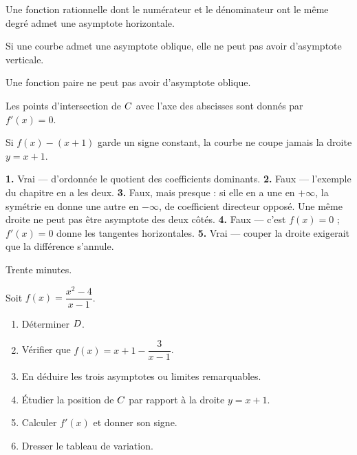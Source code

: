\begin{vraifaux}
\exo Une fonction rationnelle dont le numérateur et le dénominateur ont le
même degré admet une asymptote horizontale.

\exo Si une courbe admet une asymptote oblique, elle ne peut pas avoir
d'asymptote verticale.

\exo Une fonction paire ne peut pas avoir d'asymptote oblique.

\exo Les points d'intersection de $C$ avec l'axe des abscisses sont donnés
par $f'(x) = 0$.

\exo Si $f(x)-(x+1)$ garde un signe constant, la courbe ne coupe jamais la
droite $y = x+1$.
\end{vraifaux}

\begin{corrige}
\textbf{1.} Vrai — d'ordonnée le quotient des coefficients dominants.
\textbf{2.} Faux — l'exemple du chapitre en a les deux.
\textbf{3.} Faux, mais presque : si elle en a une en $+\infty$, la symétrie
en donne une autre en $-\infty$, de coefficient directeur opposé. Une même
droite ne peut pas être asymptote des deux côtés.
\textbf{4.} Faux — c'est $f(x) = 0$ ; $f'(x) = 0$ donne les tangentes
horizontales.
\textbf{5.} Vrai — couper la droite exigerait que la différence s'annule.
\end{corrige}

\begin{jemeteste}
Trente minutes.

Soit $f(x) = \dfrac{x^{2}-4}{x-1}$.

\begin{enumerate}[label=\textbf{\arabic*.}, leftmargin=*, itemsep=0.3em]
  \item Déterminer $D$.
  \item Vérifier que $f(x) = x+1-\dfrac{3}{x-1}$.
  \item En déduire les trois asymptotes ou limites remarquables.
  \item Étudier la position de $C$ par rapport à la droite $y = x+1$.
  \item Calculer $f'(x)$ et donner son signe.
  \item Dresser le tableau de variation.
\end{enumerate}
\end{jemeteste}

